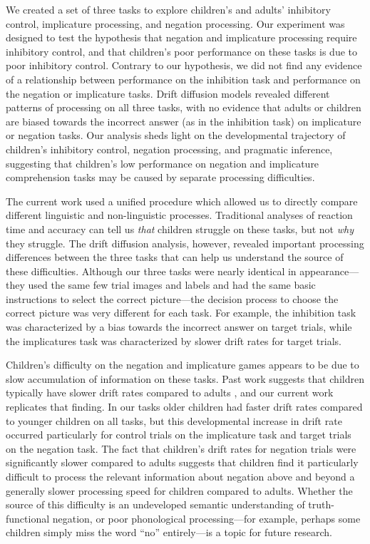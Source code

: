 \documentclass[10pt,letterpaper]{article}
\begin{document}
We created a set of three tasks to explore children's and adults' inhibitory control, implicature processing, and negation processing. Our experiment was designed to test the hypothesis that negation and implicature processing require inhibitory control, and that children's poor performance on these tasks is due to poor inhibitory control. Contrary to our hypothesis, we did not find any evidence of a relationship between performance on the inhibition task and performance on the negation or implicature tasks. Drift diffusion models revealed different patterns of processing on all three tasks, with no evidence that adults or children are biased towards the incorrect answer (as in the inhibition task) on implicature or negation tasks. Our analysis sheds light on the developmental trajectory of children's inhibitory control, negation processing, and pragmatic inference, suggesting that children's low performance on negation and implicature comprehension tasks may be caused by separate processing difficulties.

The current work used a unified procedure which allowed us to directly compare different linguistic and non-linguistic processes. Traditional analyses of reaction time and accuracy can tell us \emph{that} children struggle on these tasks, but not \emph{why} they struggle. The drift diffusion analysis, however, revealed important processing differences between the three tasks that can help us understand the source of these difficulties. Although our three tasks were nearly identical in appearance---they used the same few trial images and labels and had the same basic instructions to select the correct picture---the decision process to choose the correct picture was very different for each task. For example, the inhibition task was characterized by a bias towards the incorrect answer on target trials, while the implicatures task was characterized by slower drift rates for target trials.

Children's difficulty on the negation and implicature games appears to be due to slow accumulation of information on these tasks. Past work suggests that children typically have slower drift rates compared to adults \cite{ratcliff2012}, and our current work replicates that finding. In our tasks older children had faster drift rates compared to younger children on all tasks, but this developmental increase in drift rate occurred particularly for control trials on the implicature task and target trials on the negation task. The fact that children's drift rates for negation trials were significantly slower compared to adults suggests that children find it particularly difficult to process the relevant information about negation above and beyond a generally slower processing speed for children compared to adults. Whether the source of this difficulty is an undeveloped semantic understanding of truth-functional negation, or poor phonological processing---for example, perhaps some children simply miss the word ``no'' entirely---is a topic for future research.
\end{document}
